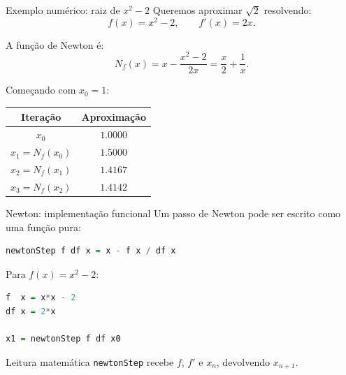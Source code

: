 \documentclass[aspectratio=169,11pt]{beamer}
\begin{document}
\begin{frame}{Exemplo numérico: raiz de $x^2-2$}
  Queremos aproximar $\sqrt{2}$ resolvendo:
  \begin{equation*}
    f(x)=x^2-2,\qquad f'(x)=2x.
  \end{equation*}

  A função de Newton é:
  \begin{equation*}
    N_f(x)=x-\frac{x^2-2}{2x}=\frac{x}{2}+\frac{1}{x}.
  \end{equation*}

  Começando com $x_0=1$:
  \begin{center}
    \begin{tabular}{c|c}
      \toprule
      Iteração & Aproximação \\
      \midrule
      $x_0$ & $1.0000$ \\
      $x_1=N_f(x_0)$ & $1.5000$ \\
      $x_2=N_f(x_1)$ & $1.4167$ \\
      $x_3=N_f(x_2)$ & $1.4142$ \\
      \bottomrule
    \end{tabular}
  \end{center}
\end{frame}

\begin{frame}[fragile]{Newton: implementação funcional}
  Um passo de Newton pode ser escrito como uma função pura:

  \begin{lstlisting}[language=Haskell]
newtonStep f df x = x - f x / df x
  \end{lstlisting}

  Para $f(x)=x^2-2$:

  \begin{lstlisting}[language=Haskell]
f  x = x*x - 2
df x = 2*x

x1 = newtonStep f df x0
  \end{lstlisting}

  \begin{block}{Leitura matemática}
    \texttt{newtonStep} recebe $f$, $f'$ e $x_n$, devolvendo $x_{n+1}$.
  \end{block}
\end{frame}
\end{document}
